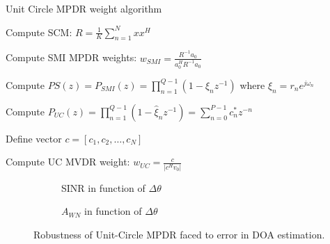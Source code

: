 \documentclass[12pt]{article}
\begin{document}
\begin{algorithm}
\caption{Unit Circle MPDR weight algorithm}


Compute SCM: $R = \frac{1}{K} \sum_{n=1}^{N} xx^H$\;

Compute SMI MPDR weights: $w_{SMI} = \frac{R^{-1}a_0}{a_0^H R^{-1} a_0}$\;

Compute $PS(z) = P_{SMI}(z) = \prod_{n=1}^{Q-1} (1 - \xi_n z^{-1})$ where $\xi_n = r_n e^{j\omega_n}$\;


Compute $P_{UC}(z) = \prod_{n=1}^{Q-1} (1 - \hat{\xi}_n z^{-1}) = \sum_{n=0}^{P-1} c^*_n z^{-n}$\;

Define vector $c = [c_1, c_2, \ldots, c_N]$\;

Compute UC MVDR weight: $w_{UC} = \frac{c}{|c^H v_0|}$\;
\label{alg:uc}
\end{algorithm}

\begin{figure}[H]
    \centering
    \begin{subfigure}[b]{0.4\linewidth}
        
        \caption{SINR in function of $\Delta\theta$}
        \label{uc_mpdr_sinr}
    \end{subfigure}\hspace{0.09\linewidth}
    \begin{subfigure}[b]{0.4\linewidth}
        
        \caption{$A_{WN}$ in function of $\Delta\theta$}
        \label{fig:uc_mpdr_awn}
    \end{subfigure}
    \caption{Robustness of Unit-Circle MPDR faced to error in DOA estimation.}
    \label{fig:uc_mpdr}
\end{figure}
\end{document}
